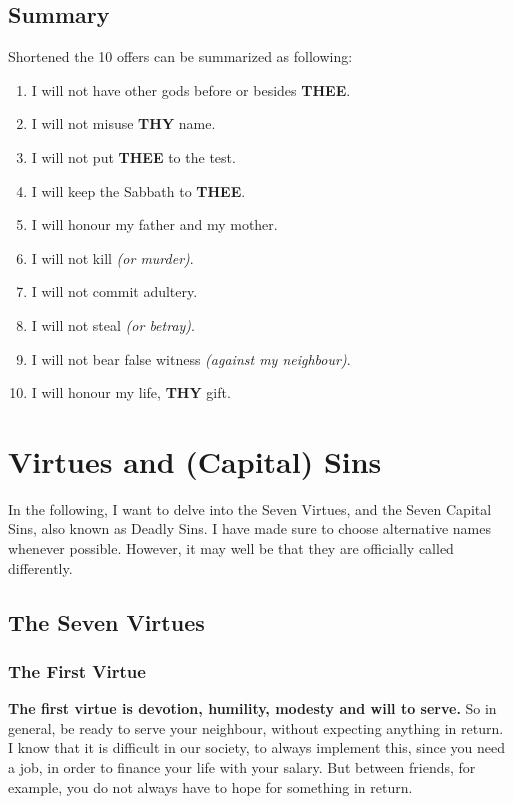 \documentclass[10pt,a5paper]{article}
\newcommand{\Thee}[0]{\textbf{THEE}}
\newcommand{\Thy}[0]{\textbf{THY}}
\begin{document}
	\subsection{Summary}
		Shortened the 10 offers can be summarized as following:
		\\
		\begin{enumerate}[nosep]
			\item I will not have other gods before or besides {\Thee}.
			\item I will not misuse {\Thy} name.
			\item I will not put {\Thee} to the test.
			\item I will keep the Sabbath to {\Thee}.
			\item I will honour my father and my mother.
			\item I will not kill \textit{(or murder)}.
			\item I will not commit adultery.
			\item I will not steal \textit{(or betray)}.
			\item I will not bear false witness \textit{(against my neighbour)}.
			\item I will honour my life, {\Thy} gift.
		\end{enumerate}

	\newpage
	\section{Virtues and (Capital) Sins}
		In the following,
		I want to delve into the Seven Virtues,
		and the Seven Capital Sins,
		also known as Deadly Sins.
		I have made sure to choose alternative names whenever possible.
		However,
		it may well be that they are officially called differently.
	
	\subsection{The Seven Virtues}
	
	\subsubsection{The First Virtue}
		\textbf{The first virtue is devotion,
		humility,
		modesty and will to serve.}
		So in general,
		be ready to serve your neighbour,
		without expecting anything in return.
		I know that it is difficult in our society,
		to always implement this,
		since you need a job,
		in order to finance your life with your salary.
		But between friends,
		for example,
		you do not always have to hope for something in return.
\end{document}
